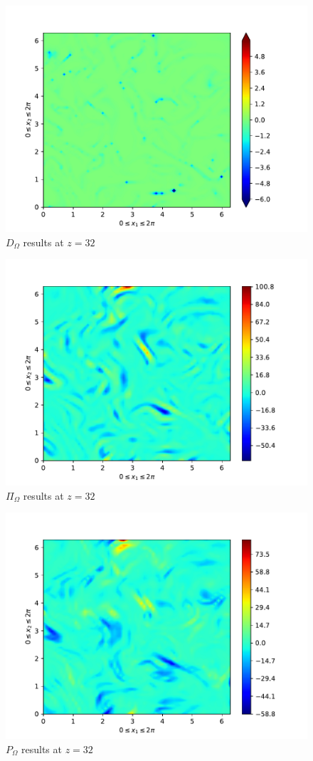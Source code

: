 \begin{figure}[H]
    \includegraphics[height=0.4\textheight]{media/run-cds-00/D-term-enstrophy}
    \caption{$D_{\Omega}$ results at $z=32$}
\end{figure}

\begin{figure}[H]
    \includegraphics[height=0.4\textheight]{media/run-cds-00/SGS-transport-term-enstrophy}
    \caption{$\Pi_{\Omega}$ results at $z=32$}
\end{figure}

\begin{figure}[H]
    \includegraphics[height=0.4\textheight]{media/run-cds-00/SGS-production-term-enstrophy}
    \caption{$P_{\Omega}$ results at $z=32$}
\end{figure}
